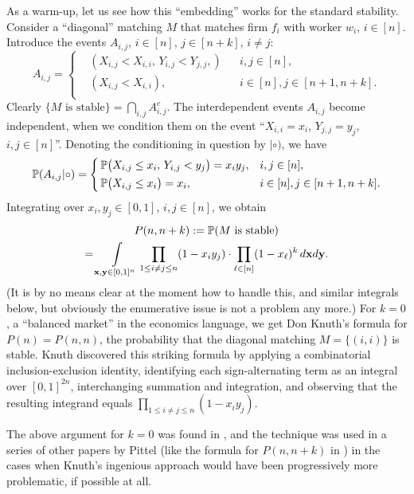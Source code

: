 \documentclass[11pt]{amsart}
\newcommand{\Prob}{\operatorname{\Bbb{P}}}
\theoremstyle{remark}
\numberwithin{equation}{section}
\begin{document}
As a warm-up, let us see how this ``embedding'' works for the standard stability. Consider a ``diagonal'' matching $M$ that matches firm $f_i$ with worker $w_i$, $i\in [n]$. Introduce the events $A_{i,j}$, $i\in [n]$, $j\in [n+k]$, $i\neq j$:
\[
A_{i,j}=\left\{\begin{aligned}
&(X_{i,j}<X_{i,i},\, Y_{i,j}<Y_{j,j},)&&i,j\in [n],\\
&(X_{i,j}<X_{i,i}),&&i\in [n], j\in [n+1,n+k].\\
\end{aligned}\right.
\]
Clearly $\{M\text{ is stable}\}=\bigcap_{i,j}A^c_{i,j}$.
The interdependent events $A_{i,j}$ become independent, when we condition them on the event ``$X_{i,i}=x_i$, $Y_{j,j}=y_j$, $i,j\in [n]$''. Denoting the conditioning in question by $|\circ)$, we have
\[
\Prob(A_{i,j}|\circ)=\left\{\begin{aligned}
&\Prob\bigl(X_{i,j}\le x_i,\,Y_{i,j}<y_j\bigr)=x_iy_j, &&i,j\in [n],\\
&\Prob\bigl(X_{i,j}\le x_i\bigr)=x_i,&&i\in [n], j\in [n+1,n+k].
\end{aligned}\right.
\]
Integrating over $x_i, y_j\in [0,1]$, $i,j\in [n]$, we obtain
\begin{multline}\label{0.9}
P(n,n+k):=\Prob(M\text{ is stable})\\
=\int\limits_{\bold x,\bold y\in [0,1]^n}\prod_{1\le i\neq j\le n}(1-x_iy_j)\cdot \prod_{\ell\in [n]}
(1-x_{\ell})^k\,d\bold x d\bold y.
\end{multline}
(It is by no means clear at the moment how to handle this, and similar integrals below, but obviously the enumerative issue is not a problem any more.) For $k=0$,  a  ``balanced market'' in the economics language, we get Don Knuth's formula for $P(n)=P(n,n)$, the probability that the diagonal matching $M=\{(i,i)\}$ is stable. 
Knuth \cite{Knu} 
discovered this striking formula by applying a combinatorial inclusion-exclusion identity, identifying each sign-alternating term as an integral over $[0,1]^{2n}$, interchanging summation and integration, and observing that the resulting integrand equals 
$\prod_{1\le i\neq j\le n}(1-x_iy_j)$. 

The above argument for $k=0$ was found in \cite{Pit1}, and the technique was used  in a series of other papers by Pittel (like the formula for $P(n,n+k)$ in \cite{Pit2}) in the cases when Knuth's ingenious approach would have been progressively more problematic, if possible at all. 
\end{document}

